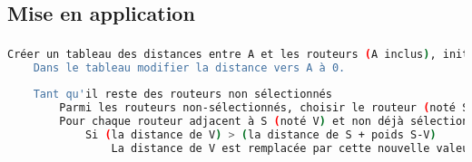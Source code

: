 \documentclass[svgnames,11pt]{beamer}
\begin{document}
\subsection{Mise en application}
\begin{frame}[fragile]
    \frametitle{}

    \begin{center}
        \begin{lstlisting}[language=bash, basicstyle=\small, xrightmargin=0.5em, xleftmargin=0.5em]
    Créer un tableau des distances entre A et les routeurs (A inclus), initialisées à l'infini.
    Dans le tableau modifier la distance vers A à 0.
    
    Tant qu'il reste des routeurs non sélectionnés
        Parmi les routeurs non-sélectionnés, choisir le routeur (noté S) ayant la plus petite distance.
        Pour chaque routeur adjacent à S (noté V) et non déjà sélectionné:
            Si (la distance de V) > (la distance de S + poids S-V)
                La distance de V est remplacée par cette nouvelle valeur
    \end{lstlisting}
        \label{dj}
    \end{center}
\end{frame}
\end{document}
